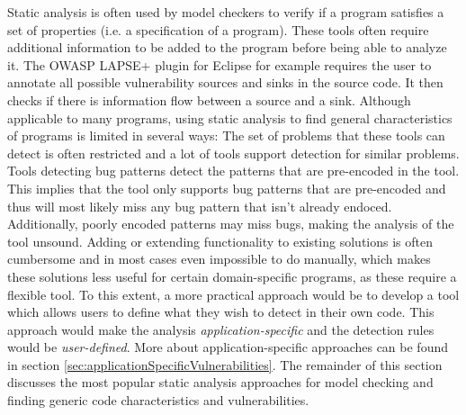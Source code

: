 Static analysis is often used by model checkers to verify if a program satisfies a set of properties (i.e. a specification of a program). These tools often require additional information to be added to the program before being able to analyze it. The OWASP LAPSE+ plugin for Eclipse\cite{OWASP:LAPSE} for example requires the user to annotate all possible vulnerability sources and sinks in the source code. It then checks if there is information flow between a source and a sink. Although applicable to many programs, using static analysis to find general characteristics of programs is limited in several ways:
The set of problems that these tools can detect is often restricted and a lot of tools support detection for similar problems. Tools detecting bug patterns detect the patterns that are pre-encoded in the tool. This implies that the tool only supports bug patterns that are pre-encoded and thus will most likely miss any bug pattern that isn't already endoced. Additionally, poorly encoded patterns may miss bugs, making the analysis of the tool unsound. Adding or extending functionality to existing solutions is often cumbersome and in most cases even impossible to do manually, which makes these solutions less useful for certain domain-specific programs, as these require a flexible tool. To this extent, a more practical approach would be to develop a tool which allows users to define what they wish to detect in their own code. This approach would make the analysis \textit{application-specific} and the detection rules would be \textit{user-defined}. More about application-specific approaches can be found in section \ref{sec:applicationSpecificVulnerabilities}. The remainder of this section discusses the most popular static analysis approaches for model checking and finding generic code characteristics and vulnerabilities.

